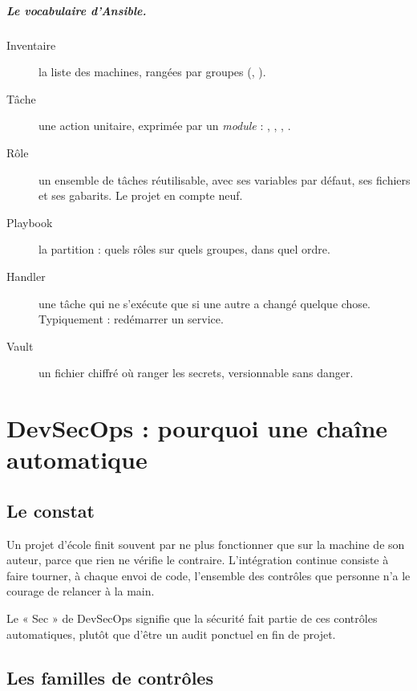\paragraph{Le vocabulaire d'Ansible.}
\begin{description}
\item[Inventaire] la liste des machines, rangées par groupes
  (\cmd{[controllers]}, \cmd{[workers]}).
\item[Tâche] une action unitaire, exprimée par un \emph{module} :
  , , , .
\item[Rôle] un ensemble de tâches réutilisable, avec ses variables par défaut,
  ses fichiers et ses gabarits. Le projet en compte neuf.
\item[Playbook] la partition : quels rôles sur quels groupes, dans quel ordre.
\item[Handler] une tâche qui ne s'exécute que si une autre a changé quelque
  chose. Typiquement : redémarrer un service.
\item[Vault] un fichier chiffré où ranger les secrets, versionnable sans
  danger.
\end{description}

\chapter{DevSecOps : pourquoi une chaîne automatique}

\section{Le constat}

Un projet d'école finit souvent par ne plus fonctionner que sur la machine de
son auteur, parce que rien ne vérifie le contraire. L'intégration continue
consiste à faire tourner, à chaque envoi de code, l'ensemble des contrôles que
personne n'a le courage de relancer à la main.

Le « Sec » de DevSecOps signifie que la sécurité fait partie de ces contrôles
automatiques, plutôt que d'être un audit ponctuel en fin de projet.

\section{Les familles de contrôles}

